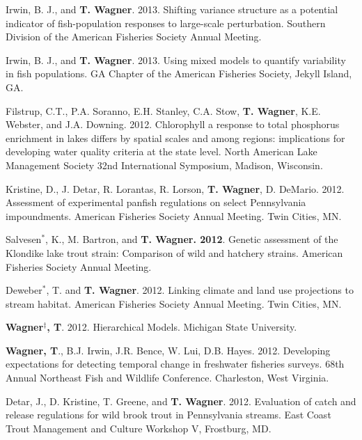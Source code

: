 \documentclass[10pt]{article}
\begin{document}
\begin{flushleft}
\begin{etaremune}
\item Irwin, B. J., and {\bf T. Wagner}. 2013. Shifting variance structure as a potential indicator of fish-population responses to large-scale perturbation. Southern Division of the American Fisheries Society Annual Meeting.

\item Irwin, B. J., and {\bf T. Wagner}. 2013. Using mixed models to quantify variability in fish populations. GA Chapter of the American Fisheries Society, Jekyll Island, GA.


\item Filstrup, C.T., P.A. Soranno, E.H. Stanley, C.A. Stow, {\bf T. Wagner}, K.E. Webster, and J.A. Downing. 2012. Chlorophyll a response to total phosphorus enrichment in lakes differs by spatial scales and among regions: implications for developing water quality criteria at the state level. North American Lake Management Society 32nd International Symposium, Madison, Wisconsin. 

\item Kristine, D., J. Detar, R. Lorantas, R. Lorson,  {\bf T. Wagner}, D. DeMario. 2012. Assessment of experimental panfish regulations on select Pennsylvania impoundments. American Fisheries Society Annual Meeting. Twin Cities, MN.

\item Salvesen$^*$, K., M. Bartron, and {\bf T. Wagner. 2012}. Genetic assessment of the Klondike lake trout strain: Comparison of wild and hatchery strains. American Fisheries Society Annual Meeting. 

\item Deweber$^*$, T. and  {\bf T. Wagner}. 2012. Linking climate and land use projections to stream habitat. American Fisheries Society Annual Meeting. Twin Cities, MN. 

\item {\bf Wagner$^\ddagger$, T}. 2012. Hierarchical Models. Michigan State University.

 \item {\bf Wagner, T}., B.J. Irwin, J.R. Bence, W. Lui, D.B. Hayes. 2012. Developing expectations for detecting temporal change in freshwater fisheries surveys. 68th Annual Northeast Fish and Wildlife Conference. Charleston, West Virginia. 

\item Detar, J., D. Kristine, T. Greene, and {\bf T. Wagner}. 2012. Evaluation of catch and release regulations for wild brook trout in Pennsylvania streams. East Coast Trout Management and Culture Workshop V, Frostburg, MD.


\end{etaremune}
\end{flushleft}
\end{document}
